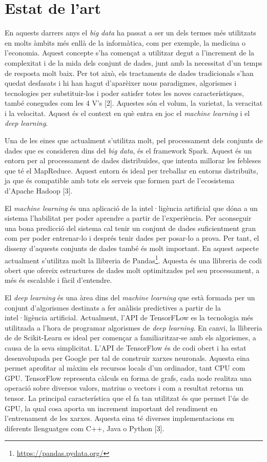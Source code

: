 \documentclass[10pt,a4paper,twocolumn,twoside]{article}
\begin{document}
\section {Estat de l'art}
En aquests darrers anys el \textit{big data} ha passat a ser un dels termes més utilitzats en molts àmbits més enllà de la informàtica, com per exemple, la medicina o l'economia. Aquest concepte s'ha començat a utilitzar degut a l'increment de la complexitat i de la mida dels conjunt de dades, junt amb la necessitat d'un temps de resposta molt baix. Per tot això, els tractaments de dades tradicionals s'han quedat desfasats i hi han hagut d'aparèixer nous paradigmes, algorismes i tecnologies per substituir-los i poder satisfer totes les noves característiques, també conegudes com les 4 V's [2]. Aquestes són el volum, la varietat, la veracitat i la velocitat. Aquest és el context en què entra en joc el \textit{machine learning} i el \textit{deep learning}. 

Una de les eines que actualment s'utilitza molt, pel processament dels conjunts de dades que es consideren dins del \textit{big data}, és el framework Spark. Aquest és un entorn per al processament de dades distribuïdes, que intenta millorar les febleses que té el MapReduce. Aquest entorn és ideal per treballar en entorns distribuïts, ja que és compatible amb tots els serveis que formen part de l'ecosistema d'Apache Hadoop [3].

El \textit{machine learning} és una aplicació de la intel·ligència artificial que dóna a un sistema l'habilitat per poder aprendre a partir de l'experiència. Per aconseguir una bona predicció del sistema cal tenir un conjunt de dades suficientment gran com per poder entrenar-lo i després tenir dades per posar-lo a prova. Per tant, el disseny d'aquests conjunts de dades també és molt important. En aquest aspecte actualment s'utilitza molt la llibreria de Pandas\footnote{\url{https://pandas.pydata.org/}}. Aquesta és una llibreria de codi obert que ofereix estructures de dades molt optimitzades pel seu processament, a més és escalable i fàcil d'entendre.

El \textit{deep learning} és una àrea dins del \textit{machine learning} que està formada per un conjunt d'algorismes destinats a fer anàlisis predictives a partir de la intel·ligència artificial. Actualment, l'API de TensorFLow es la tecnologia més utilitzada a l'hora de programar algorismes de \textit{deep learning}. En canvi, la llibreria de de Scikit-Learn es ideal per començar a familiaritzar-se amb els algorismes, a causa de la seva simplicitat. L'API de TensorFlow és de codi obert i ha estat desenvolupada per Google per tal de construir xarxes neuronals. Aquesta eina permet aprofitar al màxim els recursos locals d'un ordinador, tant CPU com GPU. TensorFlow representa càlculs en forma de grafs, cada node realitza una operació sobre diversos valors, matrius o vectors i com a resultat retorna un tensor. La principal característica que el fa tan utilitzat és que permet l'ús de GPU, la qual cosa aporta un increment important del rendiment en l'entrenament de les xarxes. Aquesta eina té diverses implementacions en diferents llenguatges com C++, Java o Python [3].
\end{document}
